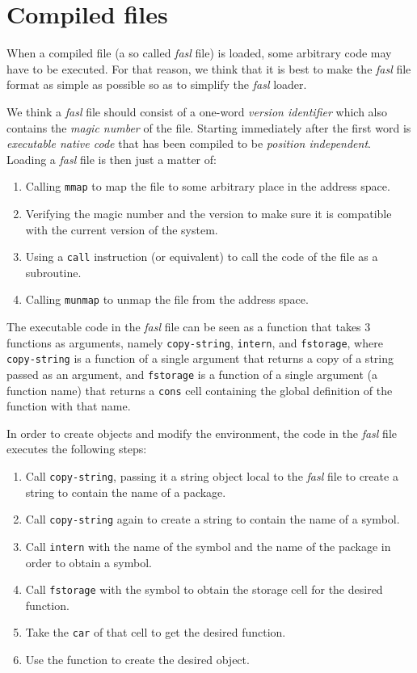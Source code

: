 \chapter{Compiled files}
\label{chap-compiled-files}

When a compiled file (a so called \emph{fasl} file) is loaded, some
arbitrary code may have to be executed.  For that reason, we think
that it is best to make the \emph{fasl} file format as simple as
possible so as to simplify the \emph{fasl} loader.

We think a \emph{fasl} file should consist of a one-word \emph{version
  identifier} which also contains the \emph{magic number} of the
file.  Starting immediately after the first word is \emph{executable
  native code} that has been compiled to be \emph{position
  independent}.  Loading a \emph{fasl} file is then just a matter of:

\begin{enumerate}
\item Calling \texttt{mmap} to map the file to some arbitrary place in
  the address space.
\item Verifying the magic number and the version to make sure it is
  compatible with the current version of the system. 
\item Using a \texttt{call} instruction (or equivalent) to call the
  code of the file as a subroutine.
\item Calling \texttt{munmap} to unmap the file from the address
  space. 
\end{enumerate}

The executable code in the \emph{fasl} file can be seen as a \commonlisp{}
function that takes 3 functions as arguments, namely
\texttt{copy-string}, \texttt{intern}, and \texttt{fstorage}, where
\texttt{copy-string} is a function of a single argument that returns a
copy of a string passed as an argument, and \texttt{fstorage} is a
function of a single argument (a function name) that returns a
\texttt{cons} cell containing the global definition of the function
with that name.

In order to create objects and modify the environment, the code in the
\emph{fasl} file executes the following steps:

\begin{enumerate}
\item Call \texttt{copy-string}, passing it a string object local to
  the \emph{fasl} file to create a string to contain the
  name of a package.
\item Call \texttt{copy-string} again to create a string to contain
  the name of a symbol.
\item Call \texttt{intern} with the name of the symbol and the name of
  the package in order to obtain a symbol.
\item Call \texttt{fstorage} with the symbol to obtain the storage
  cell for the desired function.
\item Take the \texttt{car} of that cell to get the desired function.
\item Use the function to create the desired object.
\end{enumerate}

